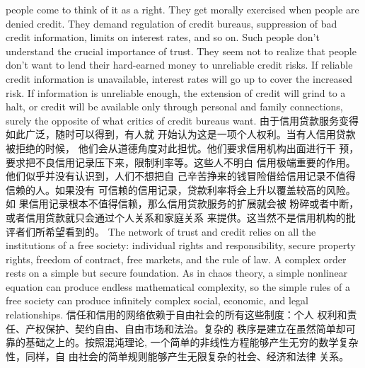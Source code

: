 \begin{paracol}{2}
people come to think of it as a right. They get morally exercised
when people are denied credit. They demand regulation of
credit bureaus, suppression of bad credit information, limits on
interest rates, and so on. Such people don't understand the crucial importance of trust. They seem not to realize that people
don't want to lend their hard-earned money to unreliable credit
risks. If reliable credit information is unavailable, interest rates
will go up to cover the increased risk. If information is unreliable enough, the extension of credit will grind to a halt, or
credit will be available only through personal and family connections, surely the opposite of what critics of credit bureaus
want.
\switchcolumn
由于信用贷款服务变得如此广泛，随时可以得到，有人就
开始认为这是一项个人权利。当有人信用贷款被拒绝的时候，
他们会从道德角度对此担忧。他们要求信用机构出面进行干
预，要求把不良信用记录压下来，限制利率等。这些人不明白
信用极端重要的作用。他们似乎并没有认识到，人们不想把自
己辛苦挣来的钱冒险借给信用记录不值得信赖的人。如果没有
可信赖的信用记录，贷款利率将会上升以覆盖较高的风险。如
果信用记录根本不值得信赖，那么信用贷款服务的扩展就会被
粉碎或者中断，或者信用贷款就只会通过个人关系和家庭关系
来提供。这当然不是信用机构的批评者们所希望看到的。
\switchcolumn*
The network of trust and credit relies on all the institutions
of a free society: individual rights and responsibility, secure
property rights, freedom of contract, free markets, and the rule
of law. A complex order rests on a simple but secure foundation.
As in chaos theory, a simple nonlinear equation can produce
endless mathematical complexity, so the simple rules of a free society can produce infinitely complex social, economic, and
legal relationships.
\switchcolumn
信任和信用的网络依赖于自由社会的所有这些制度：个人
权利和责任、产权保护、契约自由、自由市场和法治。复杂的
秩序是建立在虽然简单却可靠的基础之上的。按照混沌理论,
一个简单的非线性方程能够产生无穷的数学复杂性，同样，自
由社会的简单规则能够产生无限复杂的社会、经济和法律
关系。



\end{paracol}
